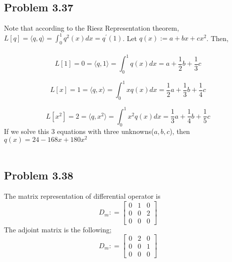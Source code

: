 \documentclass[letterpaper,12pt]{article}
\theoremstyle{definition}
\begin{document}
\begin{spacing}{1.3}{}
\subsection*{Problem 3.37}
	Note that according to the Riesz Representation theorem, $L[q] = \langle q,q \rangle = \int_{0}^{1} q^{2}(x)dx = q^{'}(1)$. Let $q(x) := a + bx + c x^2$. Then, \\\\
	\[L[1] = 0 =\langle q,1 \rangle = \int_{0}^{1} q(x)dx = a + \frac{1}{2}b + \frac{1}{3}c \]

	\[L[x] = 1 =\langle q,x \rangle = \int_{0}^{1} xq(x)dx = \frac{1}{2}a + \frac{1}{3}b + \frac{1}{4}c \]

	\[L[x^2] = 2 =\langle q,x^2 \rangle = \int_{0}^{1} x^2 q(x)dx = \frac{1}{3} a + \frac{1}{4}b + \frac{1}{5}c \]
	If we solve this 3 equations with three unknowns($a,b,c$), then
	$q(x) = 24 - 168x + 180 x^2$ \\\\

	\setlength{\leftskip}{10pt}

\subsection*{Problem 3.38}
	The matrix representation of differential operator is \\
	\[D_m : = \begin{bmatrix}
	0 & 1 & 0 \\
	0 & 0 & 2 \\
	0 & 0 & 0
	\end{bmatrix}\]
	The adjoint matrix is the following;
	\[D_m : = \begin{bmatrix}
	0 & 2 & 0 \\
	0 & 0 & 1 \\
	0 & 0 & 0
	\end{bmatrix}\]
	\setlength{\leftskip}{10pt}


\end{spacing}
\end{document}
